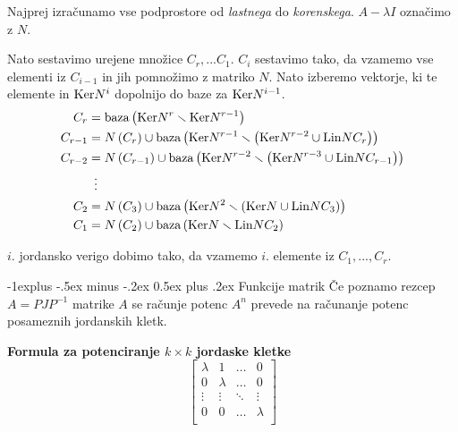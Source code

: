 \documentclass[a4paper,8pt]{extarticle}
\makeatletter
\renewcommand{\subsection}{\@startsection{subsection}{2}{0mm}%
                                {-1explus -.5ex minus -.2ex}%
                                {0.5ex plus .2ex}%
                                {\normalfont\normalsize\bfseries}}
\makeatother
\begin{document}
\begin{multicols}{3}
Najprej izračunamo vse podprostore od \emph{lastnega} do \emph{korenskega}. $A-\lambda I$ označimo z $N$.

Nato sestavimo urejene množice $C_r, ... C_1$. $C_i$ sestavimo tako, da vzamemo vse elementi iz $C_{i-1}$ in jih pomnožimo z matriko $N$. Nato izberemo vektorje, ki te elemente in $\textmd{Ker}N^i$ dopolnijo do baze za $\textmd{Ker}N^{i-1}$.
\begin{equation*}
    \begin{aligned}
        C_r &= \textmd{baza}\left( \textmd{Ker}N^{r} \smallsetminus \textmd{Ker}N^{r-1}\right) \\
        C_{r-1} &= N\left( C_{r}\right) \cup \textmd{baza} \left( \textmd{Ker}N^{r-1} \smallsetminus \left( \textmd{Ker}N^{r-2} \cup \textmd{Lin} N C_r \right) \right) \\
        C_{r-2} &= N\left( C_{r-1}\right) \cup \textmd{baza}\left( \textmd{Ker}N^{r-2} \smallsetminus \left( \textmd{Ker}N^{r-3} \cup \textmd{Lin}NC_{r-1} \right) \right) \\
        & \, \ \vdots \\
        C_{2} &= N\left( C_{3}\right) \cup \textmd{baza}\left( \textmd{Ker}N^{2} \smallsetminus \left( \textmd{Ker}N \cup \textmd{Lin}NC_{3} \right) \right) \\
        C_{1} &= N\left( C_{2}\right) \cup \textmd{baza}\left( \textmd{Ker}N \smallsetminus \textmd{Lin} NC_{2} \right) \\
    \end{aligned}
\end{equation*}

$i$. jordansko verigo dobimo tako, da vzamemo $i$. elemente iz $C_1, ..., C_r$.


\subsection{Funkcije matrik}
Če poznamo rezcep $A = PJP^{-1}$ matrike $A$ se računje potenc $A^n$ prevede na računanje potenc posameznih jordanskih kletk.

\textbf{Formula za potenciranje $k \times k$ jordaske kletke}
\[
    \begin{bmatrix}
        \lambda & 1   & \dots & 0 \\
        0 & \lambda & \dots & 0 \\
        \vdots & \vdots & \ddots & \vdots \\
        0 & 0 & \dots & \lambda \\


\end{bmatrix}\]
\end{multicols}
\end{document}
